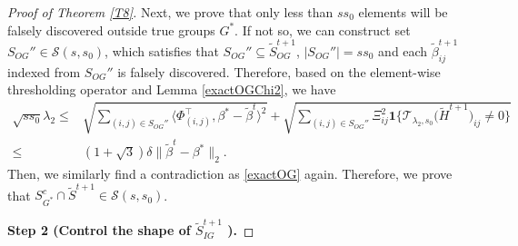 \documentclass[12pt]{article}
\newtheorem{proof}{Proof}
\begin{document}
\begin{appendix}
\begin{proof}[Proof of Theorem \ref{T8}]
Next, we prove that only less than $ss_0$ elements will be falsely discovered outside true groups $G^*$. %
If not so, we can construct set $S_{OG}'' \in \mathcal S(s,s_0)$, which satisfies that $S_{OG}'' \subseteq \tilde S_{OG}^{t+1}$, $|S_{OG}''|=ss_0$ and each $\tilde \beta_{ij}^{t+1}$ indexed from $S_{OG}''$ is falsely discovered.
Therefore, based on the element-wise thresholding operator and Lemma \ref{exactOGChi2}, we have 
\begin{equation}\label{step1.5}
    \begin{aligned}
    \sqrt{ ss_0 }\lambda_2
    \le& \sqrt{\sum_{(i,j) \in S_{OG}''} \langle{\Phi}_{(i,j)}^\top, \beta^* - \tilde\beta^{t} \rangle^2 } 
        + \sqrt{\sum_{(i,j) \in S_{OG}''} \Xi_{ij}^2 \mathbf1\Big\{ \mathcal T_{\lambda_{2},s_0} 
    \big(\tilde H^{t+1}\big)_{ij}\ne 0\Big\} }\\
    {\le} & (1+\sqrt3)\delta \|\tilde \beta^t - \beta^* \|_2 .
    \end{aligned}
\end{equation}
Then, we similarly find a contradiction as \eqref{exactOG} again.
Therefore, we prove that $S_{G^*}^c \cap \tilde S^{t+1} \in \mathcal S(s,s_0) $.

\textbf{Step 2 (Control the shape of $ \tilde S_{IG}^{t+1} $ ).} 


\end{proof}
\end{appendix}
\end{document}
